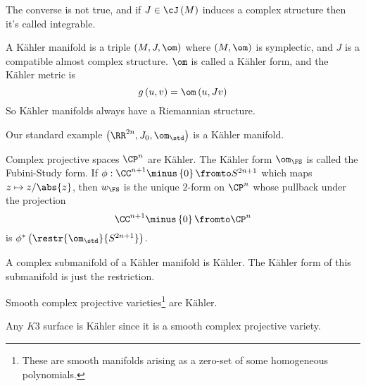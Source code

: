 \documentclass{amsart}
\begin{document}
The converse is not true, 
and if $J\in \cJ\left( M \right)$ induces a complex structure then it's called integrable.

A K\"ahler manifold is a triple $\left( M , J , \om \right)$ where $\left( M , \om \right)$
is symplectic, and $J$ is a compatible almost complex structure.
$\om$ is called a K\"ahler form, and the K\"ahler metric is
\begin{equation}
g\left( u , v \right) = \om\left( u , Jv \right)
\end{equation}
So K\"ahler manifolds always have a Riemannian structure.

\begin{exm}
Our standard example $\left( \RR^{2n} , J_0 , \om_\std \right)$ is a K\"ahler manifold.
\end{exm}

\begin{exm}
Complex projective spaces $\CP^n$ are K\"ahler.
The K\"ahler form $\om_{\FS}$ is called the Fubini-Study form.
If $\phi: \CC^{n+1}\minus \left\{ 0 \right\} \fromto S^{2n + 1}$
which maps $z\mapsto z / \abs{z}$, 
then $w_\FS$ is the unique $2$-form on $\CP^n$ whose pullback under the projection
\begin{equation}
\CC^{n+1} \minus \left\{ 0 \right\} \fromto \CP^n
\end{equation}
is $\phi^*\left( \restr{\om_\std}{S^{2n+1}} \right)$.
\end{exm}

\begin{prop}
A complex submanifold of a K\"ahler manifold is K\"ahler.
The K\"ahler form of this submanifold is just the restriction.
\end{prop}

\begin{cor}
Smooth complex projective varieties\footnote{
These are smooth manifolds arising as a zero-set of some homogeneous polynomials.}
are K\"ahler.
\end{cor}

\begin{exm}
Any $K3$ surface is K\"ahler since it is a smooth complex projective variety.
\end{exm}
\end{document}
